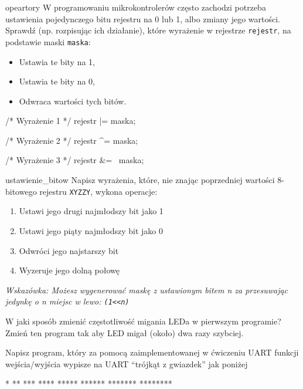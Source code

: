 \documentclass{pdfBooklets}
\begin{document}
\begin{Zadanie}{}{opeartory}
  W programowaniu mikrokontrolerów często zachodzi potrzeba ustawienia pojedynczego bitu rejestru na 0 lub 1, albo zmiany jego wartości.
  Sprawdź (np. rozpisując ich działanie), które wyrażenie w rejestrze \Verb$rejestr$, na podstawie maski \Verb$maska$:
  \begin{itemize}
  \item Ustawia te bity na 1,
  \item Ustawia te bity na 0,
  \item Odwraca wartości tych bitów.
  \end{itemize}

  \begin{CodeFrame*}[c]{}
    /* Wyrażenie 1 */
    rejestr |= maska;

    /* Wyrażenie 2 */
    rejestr ^= maska;

    /* Wyrażenie 3 */
    rejestr &= ~maska;
    \end{CodeFrame*}
\end{Zadanie}

\begin{Zadanie}{}{ustawienie_bitow}
  Napisz wyrażenia, które, nie znając poprzedniej wartości 8-bitowego rejestru \Verb$XYZZY$, wykona operacje:
  \begin{enumerate}
  \item Ustawi jego drugi najmłodszy bit jako 1
  \item Ustawi jego piąty najmłodszy bit jako 0
  \item Odwróci jego najstarszy bit
  \item Wyzeruje jego dolną połowę
  \end{enumerate}
  \textit{Wskazówka: Możesz wygenerować maskę z ustawionym bitem n za przesuwając jedynkę o n miejsc w lewo: \Verb$(1<<n)$}
\end{Zadanie}

\begin{Zadanie}{}{}
W jaki sposób zmienić częstotliwość migania LEDa w pierwszym programie? Zmień ten program tak aby LED migał (około) dwa razy szybciej.
\end{Zadanie}

\begin{Zadanie}{}{}
Napisz program, który za pomocą zaimplementowanej w ćwiczeniu UART funkcji wejścia/wyjścia wypisze na UART
``trójkąt z gwiazdek'' jak poniżej

\begin{CodeFrame*}[text]{}
*
**
***
****
*****
******
*******
********
\end{CodeFrame*}
\end{Zadanie}
\end{document}
